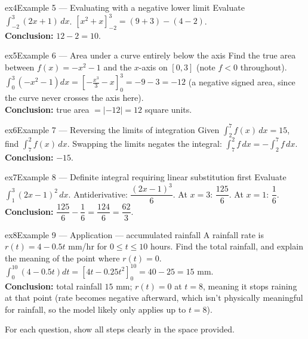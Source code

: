 \documentclass[11pt]{article}
\begin{document}
\begin{example}{ex4}{Example 5 --- Evaluating with a negative lower limit}
Evaluate $\displaystyle\int_{-2}^{3}(2x+1)\,dx$.\soln
$[x^2+x]_{-2}^3=(9+3)-(4-2)$.\\[3pt]\textbf{Conclusion:} $12-2=10$.
\end{example}

\begin{example}{ex5}{Example 6 --- Area under a curve entirely below the axis}
Find the true area between $f(x)=-x^2-1$ and the $x$-axis on $[0,3]$ (note $f<0$ throughout).\soln
$\int_0^3(-x^2-1)dx=\left[-\tfrac{x^3}3-x\right]_0^3=-9-3=-12$ (a negative signed area, since the curve never crosses the axis here).\\[3pt]\textbf{Conclusion:} true area $=|-12|=12$ square units.
\end{example}

\begin{example}{ex6}{Example 7 --- Reversing the limits of integration}
Given $\displaystyle\int_2^7f(x)\,dx=15$, find $\displaystyle\int_7^2f(x)\,dx$.\soln
Swapping the limits negates the integral: $\int_7^2f\,dx=-\int_2^7f\,dx$.\\[3pt]\textbf{Conclusion:} $-15$.
\end{example}

\begin{example}{ex7}{Example 8 --- Definite integral requiring linear substitution first}
Evaluate $\displaystyle\int_1^3(2x-1)^2\,dx$.\soln
Antiderivative: $\dfrac{(2x-1)^3}{6}$. At $x=3$: $\dfrac{125}6$. At $x=1$: $\dfrac16$.\\[3pt]\textbf{Conclusion:} $\dfrac{125}6-\dfrac16=\dfrac{124}6=\dfrac{62}3$.
\end{example}

\begin{example}{ex8}{Example 9 --- Application --- accumulated rainfall}
A rainfall rate is $r(t)=4-0.5t$ mm/hr for $0\leq t\leq10$ hours. Find the total rainfall, and explain the meaning of the point where $r(t)=0$.\soln
$\int_0^{10}(4-0.5t)dt=[4t-0.25t^2]_0^{10}=40-25=15$ mm.\\[3pt]\textbf{Conclusion:} total rainfall $15$ mm; $r(t)=0$ at $t=8$, meaning it stops raining at that point (rate becomes negative afterward, which isn't physically meaningful for rainfall, so the model likely only applies up to $t=8$).
\end{example}

\clearpage
{}
For each question, show all steps clearly in the space provided.
\end{document}
